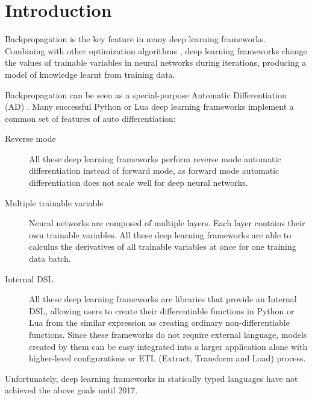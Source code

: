 \section{Introduction \label{introduction}}

Backpropagation \cite{rumelhart1985learning} is the key feature in many deep learning frameworks. Combining with other optimization algorithms \cite{kingma2014adam, zeiler2012adadelta,duchi2011adaptive}, deep learning frameworks change the values of trainable variables in neural networks during iterations, producing a model of knowledge learnt from training data.

Backpropagation can be seen as a special-purpose Automatic Differentiation (AD) \cite{baydin2015automatic}. Many successful Python or Lua deep learning frameworks \cite{collobert2008torch,bergstra2010theano,tokui2015chainer,google2017eager,paszke2017pytorch} implement a common set of features of auto differentiation:

\begin{description}

  \item[Reverse mode] All these deep learning frameworks perform reverse mode automatic differentiation instead of forward mode, as forward mode automatic differentiation does not scale well for deep neural networks.

  \item[Multiple trainable variable] Neural networks are composed of multiple layers. Each layer contains their own trainable variables. All these deep learning frameworks are able to calculus the derivatives of all trainable variables at once for one training data batch.

  \item[Internal DSL \cite{fowler2010domain}] All these deep learning frameworks are libraries that provide an Internal DSL, allowing users to create their differentiable functions in Python or Lua from the similar expression as creating ordinary non-differentiable functions. Since these frameworks do not require external language, models created by them can be easy integrated into a larger application alone with higher-level configurations \cite{chollet2015keras} or ETL (Extract, Transform and Load) process.

\end{description}

Unfortunately, deep learning frameworks in statically typed languages have not achieved the above goals until 2017.

